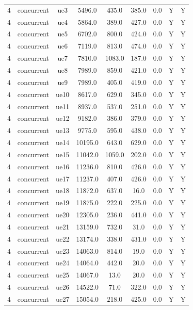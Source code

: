 \begin{table}[ht]
\begin{tabular}{|c|c|c|c|c|c|c|c|c|}
4 & concurrent & ue3 & 5496.0 & 435.0 & 385.0 & 0.0 & Y & Y \\
4 & concurrent & ue4 & 5864.0 & 389.0 & 427.0 & 0.0 & Y & Y \\
4 & concurrent & ue5 & 6702.0 & 800.0 & 424.0 & 0.0 & Y & Y \\
4 & concurrent & ue6 & 7119.0 & 813.0 & 474.0 & 0.0 & Y & Y \\
4 & concurrent & ue7 & 7810.0 & 1083.0 & 187.0 & 0.0 & Y & Y \\
4 & concurrent & ue8 & 7989.0 & 859.0 & 421.0 & 0.0 & Y & Y \\
4 & concurrent & ue9 & 7989.0 & 405.0 & 419.0 & 0.0 & Y & Y \\
4 & concurrent & ue10 & 8617.0 & 629.0 & 345.0 & 0.0 & Y & Y \\
4 & concurrent & ue11 & 8937.0 & 537.0 & 251.0 & 0.0 & Y & Y \\
4 & concurrent & ue12 & 9182.0 & 386.0 & 379.0 & 0.0 & Y & Y \\
4 & concurrent & ue13 & 9775.0 & 595.0 & 438.0 & 0.0 & Y & Y \\
4 & concurrent & ue14 & 10195.0 & 643.0 & 629.0 & 0.0 & Y & Y \\
4 & concurrent & ue15 & 11042.0 & 1059.0 & 202.0 & 0.0 & Y & Y \\
4 & concurrent & ue16 & 11236.0 & 810.0 & 426.0 & 0.0 & Y & Y \\
4 & concurrent & ue17 & 11237.0 & 407.0 & 426.0 & 0.0 & Y & Y \\
4 & concurrent & ue18 & 11872.0 & 637.0 & 16.0 & 0.0 & Y & Y \\
4 & concurrent & ue19 & 11875.0 & 222.0 & 225.0 & 0.0 & Y & Y \\
4 & concurrent & ue20 & 12305.0 & 236.0 & 441.0 & 0.0 & Y & Y \\
4 & concurrent & ue21 & 13159.0 & 732.0 & 31.0 & 0.0 & Y & Y \\
4 & concurrent & ue22 & 13174.0 & 338.0 & 431.0 & 0.0 & Y & Y \\
4 & concurrent & ue23 & 14063.0 & 814.0 & 19.0 & 0.0 & Y & Y \\
4 & concurrent & ue24 & 14064.0 & 442.0 & 20.0 & 0.0 & Y & Y \\
4 & concurrent & ue25 & 14067.0 & 13.0 & 20.0 & 0.0 & Y & Y \\
4 & concurrent & ue26 & 14522.0 & 71.0 & 322.0 & 0.0 & Y & Y \\
4 & concurrent & ue27 & 15054.0 & 218.0 & 425.0 & 0.0 & Y & Y \\

\end{tabular}
\end{table}

